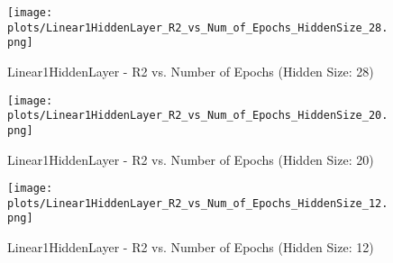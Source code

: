 \begin{figure}[H]
    \centering
    \texttt{[image: plots/Linear1HiddenLayer\_R2\_vs\_Num\_of\_Epochs\_HiddenSize\_28.png]}
    \caption{Linear1HiddenLayer - R2 vs. Number of Epochs (Hidden Size: 28)}
\end{figure}

\begin{figure}[H]
    \centering
    \texttt{[image: plots/Linear1HiddenLayer\_R2\_vs\_Num\_of\_Epochs\_HiddenSize\_20.png]}
    \caption{Linear1HiddenLayer - R2 vs. Number of Epochs (Hidden Size: 20)}
\end{figure}

\begin{figure}[H]
    \centering
    \texttt{[image: plots/Linear1HiddenLayer\_R2\_vs\_Num\_of\_Epochs\_HiddenSize\_12.png]}
    \caption{Linear1HiddenLayer - R2 vs. Number of Epochs (Hidden Size: 12)}
\end{figure}

